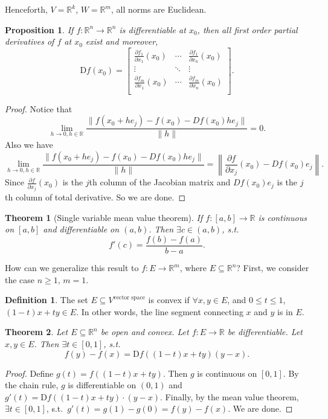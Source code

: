 \documentclass[12pt]{article}
\theoremstyle{plain}
\newtheorem{thm}{Theorem}
\newtheorem*{prop}{Proposition}
\theoremstyle{definition}
\newtheorem*{defn}{Definition}
\begin{document}
Henceforth, $V=\mathbb{R}^k$, $W=\mathbb{R}^m$, all norms are Euclidean.
\begin{prop}
    If $f: \mathbb{R}^n \rightarrow \mathbb{R}^n$ is differentiable at $x_0$, then all first order partial derivatives of $f$ at $x_0$ exist and
    moreover,
    \[
        \mathrm{D}f(x_0) = 
        \begin{bmatrix}
            \frac{\partial f_1}{\partial x_1}(x_0) & \cdots &\frac{\partial f_1}{\partial x_n}(x_0)\\
                \vdots&\ddots&\vdots\\
            \frac{\partial f_m}{\partial x_1}(x_0) & \cdots &\frac{\partial f_m}{\partial x_n}(x_0)\\
        \end{bmatrix}.
    \]
\end{prop}
\begin{proof}
    Notice that
    \[
        \lim_{h\rightarrow 0, h\in\mathbb{R}} \frac{\|f(x_0+he_j) - f(x_0) - Df(x_0)he_j\|}{\|h\|} = 0.
    \]
    Also we have
    \[
        \lim_{h\rightarrow 0, h\in\mathbb{R}} \frac{\|f(x_0+he_j) - f(x_0) - Df(x_0)he_j\|}{\|h\|} 
        = \left\|\frac{\partial f}{\partial x_j}(x_0) - Df(x_0)e_j\right\|.
    \]
    Since $\frac{\partial f}{\partial x_j}(x_0)$ is the $j$th column of the Jacobian matrix and $Df(x_0)e_j$ is the $j$th column of total derivative.
    So we are done.
\end{proof}

\begin{thm}[Single variable mean value theorem]
    If $f:[a,b]\rightarrow\mathbb{R}$ is continuous on $[a,b]$ and differentiable on $(a,b)$.
        Then $\exists c\in(a,b)$, s.t.
        \[
            f'(c) = \frac{f(b)-f(a)}{b-a}.
        \]
\end{thm}
How can we generalize this result to $f: E\rightarrow\mathbb{R}^m$, where $E\subseteq \mathbb{R}^n$?
First, we consider the case $n\geq 1$, $m=1$.

\begin{defn}
    The set $E\subseteq V^{\text{vector space}}$ is convex if $\forall x,y\in E$, and $0\leq t\leq 1$, $(1-t)x+ty\in E$.
    In other words, the line segment connecting $x$ and $y$ is in $E$.
\end{defn}

\begin{thm}
    Let $E\subseteq \mathbb{R}^n$ be open and convex.
    Let $f: E\rightarrow \mathbb{R}$ be differentiable.
    Let $x, y\in E$.
    Then $\exists t\in[0,1]$, s.t.\ 
    \[
        f(y) - f(x) = \mathrm{D}f((1-t)x+ty)(y-x).
    \]
\end{thm}
\begin{proof}
    Define $g(t) = f((1-t)x+ty)$.
    Then $g$ is continuous on $[0,1]$.
    By the chain rule, $g$ is differentiable on $(0,1)$ and $g'(t) = \mathrm{D}f((1-t)x + ty)\cdot(y-x)$.
    Finally, by the mean value theorem, $\exists t\in[0,1]$, s.t.\
    $g'(t) = g(1) - g(0) = f(y)-f(x)$.
    We are done.
\end{proof}
\end{document}
